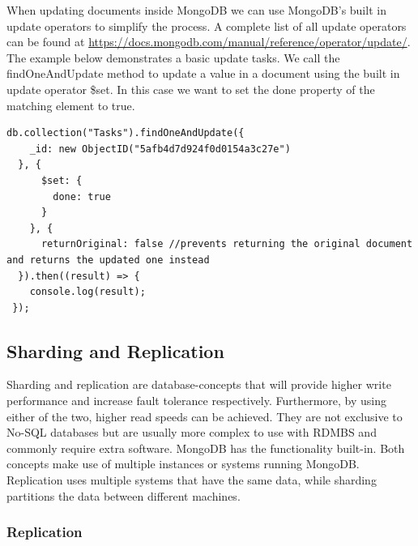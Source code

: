 \documentclass[11pt]{article}
\begin{document}
When updating documents inside MongoDB we can use MongoDB's built in update operators to simplify the process. A complete list of all update operators can be found at \url{https://docs.mongodb.com/manual/reference/operator/update/}. The example below demonstrates a basic update tasks. We call the findOneAndUpdate method to update a value in a document using the built in update operator \$set. In this case we want to set the done property of the matching element to true. 

\begin{lstlisting}
db.collection("Tasks").findOneAndUpdate({
    _id: new ObjectID("5afb4d7d924f0d0154a3c27e")
  }, {
      $set: {
        done: true
      }
    }, {
      returnOriginal: false //prevents returning the original document and returns the updated one instead
  }).then((result) => {
    console.log(result);
 });
\end{lstlisting}
 

\subsection{Sharding and Replication}
Sharding and replication are database-concepts that will provide higher write performance and increase fault tolerance respectively. Furthermore, by using either of the two, higher read speeds can be achieved. 
They are not exclusive to No-SQL databases but are usually more complex to use with RDMBS and commonly require extra software. 
MongoDB has the functionality built-in. Both concepts make use of multiple instances or systems running MongoDB. 
Replication uses multiple systems that have the same data, while sharding partitions the data between different machines. 
\subsubsection{Replication}
\end{document}
